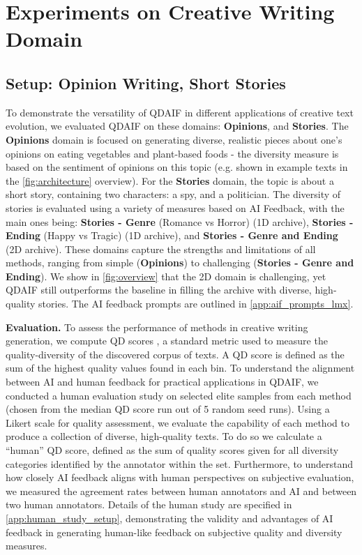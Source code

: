 \section{Experiments on Creative Writing Domain}
\subsection{Setup: Opinion Writing, Short Stories}\label{main:setup}

To demonstrate the versatility of QDAIF in different applications of creative text evolution, we evaluated QDAIF on these domains: \textbf{Opinions}, and \textbf{Stories}. The \textbf{Opinions} domain is focused on generating diverse, realistic pieces about one's opinions on eating vegetables and plant-based foods - the diversity measure is based on the sentiment of opinions on this topic (e.g. shown in example texts in the \cref{fig:architecture} overview). For the \textbf{Stories} domain, the topic is about a short story, containing two characters: a spy, and a politician. The diversity of stories is evaluated using a variety of measures based on AI Feedback, with the main ones being: \textbf{Stories - Genre} (Romance vs Horror) (1D archive), \textbf{Stories - Ending} (Happy vs Tragic) (1D archive), and \textbf{Stories - Genre and Ending} (2D archive). These domains capture the strengths and limitations of all methods, ranging from simple (\textbf{Opinions}) to challenging (\textbf{Stories - Genre and Ending}). We show in \cref{fig:overview} that the 2D domain is challenging, yet QDAIF still outperforms the baseline in filling the archive with diverse, high-quality stories. The AI feedback prompts are outlined in \cref{app:aif_prompts_lmx}.

\textbf{Evaluation.}
To assess the performance of methods in creative writing generation, we compute QD scores \citep{pugh2016quality}, a standard metric used to measure the quality-diversity of the discovered corpus of texts. A QD score is defined as the sum of the highest quality values found in each bin. To understand the alignment between AI and human feedback for practical applications in QDAIF, we conducted a human evaluation study on selected elite samples from each method (chosen from the median QD score run out of 5 random seed runs). Using a Likert scale \citep{allen2007likert} for quality assessment, we evaluate the capability of each method to produce a collection of diverse, high-quality texts. To do so we calculate a  ``human'' QD score, defined as the sum of quality scores given for all diversity categories identified by the annotator within the set. Furthermore, to understand how closely AI feedback aligns with human perspectives on subjective evaluation, we measured the agreement rates between human annotators and AI and between two human annotators. Details of the human study are specified in \cref{app:human_study_setup}, demonstrating the validity and advantages of AI feedback in generating human-like feedback on subjective quality and diversity measures.
